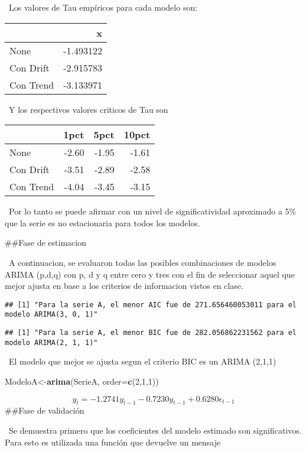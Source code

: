 \documentclass[]{article}
\newenvironment{Shaded}{\begin{snugshade}}{\end{snugshade}}
\newcommand{\DataTypeTok}[1]{\textcolor[rgb]{0.13,0.29,0.53}{#1}}
\newcommand{\DecValTok}[1]{\textcolor[rgb]{0.00,0.00,0.81}{#1}}
\newcommand{\KeywordTok}[1]{\textcolor[rgb]{0.13,0.29,0.53}{\textbf{#1}}}
\newcommand{\NormalTok}[1]{#1}
\begin{document}
~Los valores de Tau empíricos para cada modelo son:

\begin{longtable}[]{@{}lr@{}}
\toprule
& x\tabularnewline
\midrule
\endhead
None & -1.493122\tabularnewline
Con Drift & -2.915783\tabularnewline
Con Trend & -3.133971\tabularnewline
\bottomrule
\end{longtable}

~Y los respectivos valores criticos de Tau son

\begin{longtable}[]{@{}lrrr@{}}
\toprule
& 1pct & 5pct & 10pct\tabularnewline
\midrule
\endhead
None & -2.60 & -1.95 & -1.61\tabularnewline
Con Drift & -3.51 & -2.89 & -2.58\tabularnewline
Con Trend & -4.04 & -3.45 & -3.15\tabularnewline
\bottomrule
\end{longtable}

~Por lo tanto se puede afirmar con un nivel de significatividad
aproximado a 5\% que la serie es no estacionaria para todos los modelos.

\#\#Fase de estimacion

~A continuacion, se evaluaron todas las posibles combinaciones de
modelos ARIMA (p,d,q) con p, d y q entre cero y tres con el fin de
seleccionar aquel que mejor ajusta en base a los criterios de
informacion vistos en clase.

\begin{verbatim}
## [1] "Para la serie A, el menor AIC fue de 271.656460053011 para el modelo ARIMA(3, 0, 1)"
\end{verbatim}

\begin{verbatim}
## [1] "Para la serie A, el menor BIC fue de 282.056862231562 para el modelo ARIMA(2, 1, 1)"
\end{verbatim}

~El modelo que mejor se ajusta segun el criterio BIC es un ARIMA (2,1,1)

\begin{Shaded}
\begin{Highlighting}[]
\NormalTok{ModeloA<-}\KeywordTok{arima}\NormalTok{(SerieA, }\DataTypeTok{order=}\KeywordTok{c}\NormalTok{(}\DecValTok{2}\NormalTok{,}\DecValTok{1}\NormalTok{,}\DecValTok{1}\NormalTok{))}
\end{Highlighting}
\end{Shaded}

\[y_t=-1.2741y_{t-1}-0.7230y_{t-1}+0.6280\epsilon_{t-1}\] \#\#Fase de
validación

~Se demuestra primero que los coeficientes del modelo estimado son
significativos. Para esto es utilizada una función que devuelve un
mensaje
\end{document}
